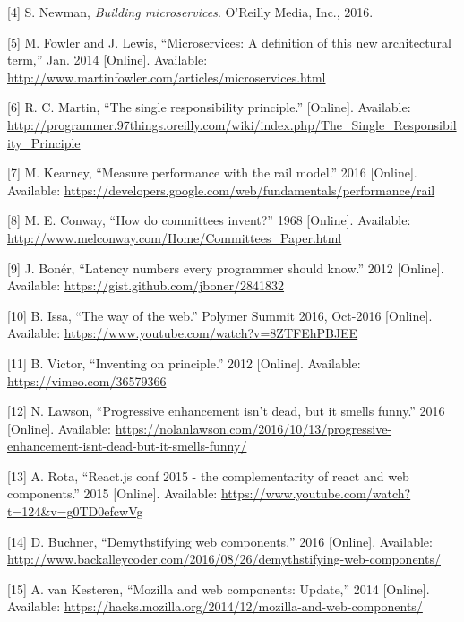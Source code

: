 \documentclass[]{article}
\begin{document}
\hypertarget{ref-Newman2015}{}
{[}4{]} S. Newman, \emph{Building microservices}. O'Reilly Media, Inc.,
2016.

\hypertarget{ref-Fowler2014}{}
{[}5{]} M. Fowler and J. Lewis, ``Microservices: A definition of this
new architectural term,'' Jan. 2014 {[}Online{]}. Available:
\url{http://www.martinfowler.com/articles/microservices.html}

\hypertarget{ref-Martin}{}
{[}6{]} R. C. Martin, ``The single responsibility principle.''
{[}Online{]}. Available:
\url{http://programmer.97things.oreilly.com/wiki/index.php/The_Single_Responsibility_Principle}

\hypertarget{ref-Kearney2016}{}
{[}7{]} M. Kearney, ``Measure performance with the rail model.'' 2016
{[}Online{]}. Available:
\url{https://developers.google.com/web/fundamentals/performance/rail}

\hypertarget{ref-Conway1968}{}
{[}8{]} M. E. Conway, ``How do committees invent?'' 1968 {[}Online{]}.
Available: \url{http://www.melconway.com/Home/Committees_Paper.html}

\hypertarget{ref-Boner2012}{}
{[}9{]} J. Bonér, ``Latency numbers every programmer should know.'' 2012
{[}Online{]}. Available: \url{https://gist.github.com/jboner/2841832}

\hypertarget{ref-Issa2016}{}
{[}10{]} B. Issa, ``The way of the web.'' Polymer Summit 2016, Oct-2016
{[}Online{]}. Available:
\url{https://www.youtube.com/watch?v=8ZTFEhPBJEE}

\hypertarget{ref-Victor2012}{}
{[}11{]} B. Victor, ``Inventing on principle.'' 2012 {[}Online{]}.
Available: \url{https://vimeo.com/36579366}

\hypertarget{ref-Lawson2016}{}
{[}12{]} N. Lawson, ``Progressive enhancement isn't dead, but it smells
funny.'' 2016 {[}Online{]}. Available:
\url{https://nolanlawson.com/2016/10/13/progressive-enhancement-isnt-dead-but-it-smells-funny/}

\hypertarget{ref-Rota2015}{}
{[}13{]} A. Rota, ``React.js conf 2015 - the complementarity of react
and web components.'' 2015 {[}Online{]}. Available:
\url{https://www.youtube.com/watch?t=124\&v=g0TD0efcwVg}

\hypertarget{ref-Buchner2016}{}
{[}14{]} D. Buchner, ``Demythstifying web components,'' 2016
{[}Online{]}. Available:
\url{http://www.backalleycoder.com/2016/08/26/demythstifying-web-components/}

\hypertarget{ref-vanKesteren2014}{}
{[}15{]} A. van Kesteren, ``Mozilla and web components: Update,'' 2014
{[}Online{]}. Available:
\url{https://hacks.mozilla.org/2014/12/mozilla-and-web-components/}
\end{document}
